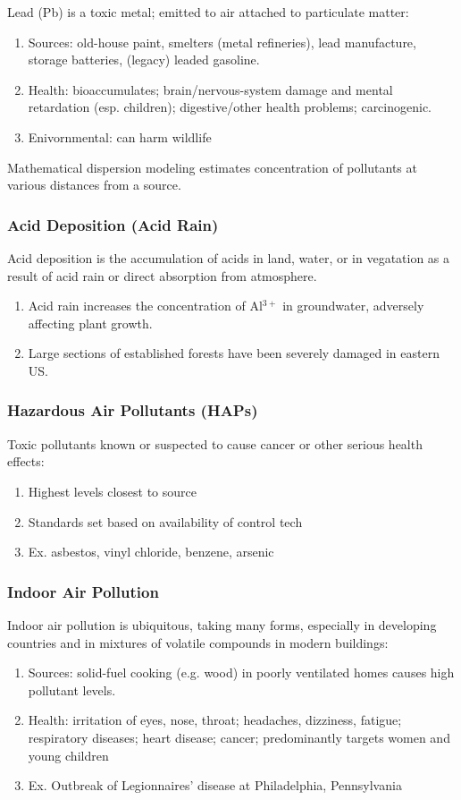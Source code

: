 \documentclass[12pt, a4paper]{article}
\begin{document}
\begin{multicols*}{3}
Lead (Pb) is a toxic metal; emitted to air attached to particulate matter:
\begin{enumerate}[\roman*.]
  \item Sources: old-house paint, smelters (metal refineries), lead manufacture, storage batteries, (legacy) leaded gasoline.
  \item Health: bioaccumulates; brain/nervous-system damage and mental retardation (esp. children); digestive/other health problems; carcinogenic.
  \item Enivornmental: can harm wildlife
\end{enumerate}

Mathematical dispersion modeling estimates concentration of pollutants at various distances from a source.
\vspace{-1em}
\colbreak
\subsubsection{Acid Deposition (Acid Rain)}
Acid deposition is the accumulation of acids in land, water, or in vegatation as a result of acid rain or direct absorption from atmosphere.
\begin{enumerate}[\roman*.]
  \item Acid rain increases the concentration of Al$^{3+}$ in groundwater, adversely affecting plant growth. 
  \item Large sections of established forests have been severely damaged in eastern US.
\end{enumerate}

\subsubsection{Hazardous Air Pollutants (HAPs)}
Toxic pollutants known or suspected to cause cancer or other serious health effects: 
\begin{enumerate}[\roman*.]
  \item Highest levels closest to source
  \item Standards set based on availability of control tech  
  \item Ex. asbestos, vinyl chloride, benzene, arsenic
\end{enumerate}

\subsubsection{Indoor Air Pollution}
Indoor air pollution is ubiquitous, taking many forms, especially in developing countries and in mixtures of volatile compounds in modern buildings:
\begin{enumerate}[\roman*.]
  \item Sources: solid-fuel cooking (e.g. wood) in poorly ventilated homes causes high pollutant levels.
  \item Health: irritation of eyes, nose, throat; headaches, dizziness, fatigue; respiratory diseases; heart disease; cancer; predominantly targets women and young children
  \item Ex. Outbreak of Legionnaires’ disease at Philadelphia, Pennsylvania
\end{enumerate}


\end{multicols*}
\end{document}
